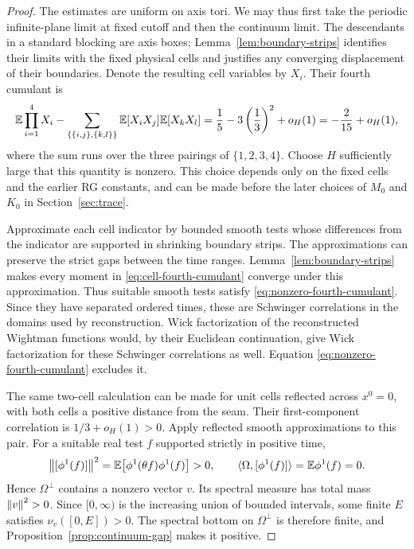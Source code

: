 \begin{proof}
The estimates are uniform on axis tori.  We may thus first take the
periodic infinite-plane limit at fixed cutoff and then the continuum
limit.  The descendants in a standard blocking are axis boxes;
Lemma~\ref{lem:boundary-strips} identifies their limits with the fixed
physical cells and justifies any converging displacement of their
boundaries.  Denote the resulting cell variables by $X_i$.  Their
fourth cumulant is
\begin{equation}
 \mathbb E\prod_{i=1}^4X_i
   -\sum_{\{\{i,j\},\{k,l\}\}}\mathbb E[X_iX_j]\mathbb E[X_kX_l]
   =\frac15-3\left(\frac13\right)^2+o_H(1)
   =-\frac{2}{15}+o_H(1),
 \label{eq:cell-fourth-cumulant}
\end{equation}
where the sum runs over the three pairings of $\{1,2,3,4\}$.
Choose $H$ sufficiently large that this quantity is nonzero.  This
choice depends only on the fixed cells and the earlier RG constants,
and can be made before the later choices of $M_0$ and $K_0$ in
Section~\ref{sec:trace}.

Approximate each cell indicator by bounded smooth tests whose
differences from the indicator are supported in shrinking boundary
strips.  The approximations can preserve the strict gaps between the
time ranges.  Lemma~\ref{lem:boundary-strips} makes every moment in
\eqref{eq:cell-fourth-cumulant} converge under this approximation.
Thus suitable smooth tests satisfy
\eqref{eq:nonzero-fourth-cumulant}.  Since they have separated ordered
times, these are Schwinger correlations in the domains used by
reconstruction.  Wick factorization of the reconstructed Wightman
functions would, by their Euclidean continuation, give Wick
factorization for these Schwinger correlations as well.  Equation
\eqref{eq:nonzero-fourth-cumulant} excludes it.

The same two-cell calculation can be made for unit cells reflected
across $x^0=0$, with both cells a positive distance from the seam.
Their first-component correlation is $1/3+o_H(1)>0$.  Apply reflected
smooth approximations to this pair.  For a suitable real test $f$
supported strictly in positive time,
\[
 \left\lVert[\phi^1(f)]\right\rVert^2
   =\mathbb E\bigl[\phi^1(\theta f)\phi^1(f)\bigr]>0,
 \qquad
 \langle\Omega,[\phi^1(f)]\rangle=\mathbb E\phi^1(f)=0.
\]
Hence $\Omega^\perp$ contains a nonzero vector $v$.  Its spectral
measure has total mass $\left\lVert v\right\rVert^2>0$.  Since $[0,\infty)$ is the
increasing union of bounded intervals, some finite $E$ satisfies
$\nu_v([0,E])>0$.  The spectral bottom on $\Omega^\perp$ is therefore
finite, and Proposition~\ref{prop:continuum-gap} makes it positive.
\end{proof}

